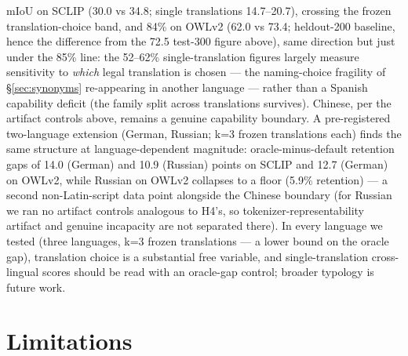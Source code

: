 \documentclass[11pt]{article}
\newcommand{\miou}{mIoU}
\begin{document}
\miou{} on SCLIP (30.0 vs 34.8; single translations 14.7--20.7), crossing
the frozen translation-choice band, and 84\% on OWLv2 (62.0 vs 73.4;
heldout-200 baseline, hence the difference from the 72.5 test-300 figure
above), same
direction but just under the 85\% line: the
52--62\% single-translation figures largely measure sensitivity to
\emph{which} legal translation is chosen --- the naming-choice fragility
of \S\ref{sec:synonyms} re-appearing in another language --- rather than
a Spanish capability deficit (the family split across translations
survives). Chinese, per the artifact controls above, remains a genuine
capability boundary. A pre-registered two-language extension (German,
Russian; k=3 frozen translations each) finds the same structure at
language-dependent magnitude: oracle-minus-default retention gaps of 14.0
(German) and 10.9 (Russian) points on SCLIP and 12.7 (German) on OWLv2,
while Russian on OWLv2 collapses to a floor (5.9\% retention) --- a second
non-Latin-script data point alongside the Chinese boundary (for Russian we
ran no artifact controls analogous to H4's, so tokenizer-representability
artifact and genuine incapacity are not separated there). In every
language we tested (three languages, k=3 frozen translations --- a lower
bound on the oracle gap), translation choice is a substantial free
variable, and single-translation cross-lingual scores should be read with
an oracle-gap control; broader typology is future work.

\section{Limitations}
\label{sec:limitations}
\end{document}
